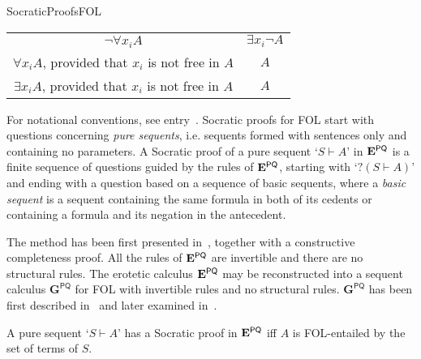 \begin{entry}{SocraticProofsFOL}
\begin{calculus}
\begin{center}
\begin{tabular}{c|c}
$\neg\forall x_{i}A$ & $\exists x_{i}\neg A$ \\
			
$\forall x_{i}A$, provided that $x_{i}$ is not free in $A$ & $A$ \\
			
$\exists x_{i}A$, provided that $x_{i}$ is not free in $A$ & $A$ \\
	\end{tabular}

\end{center}
\end{calculus}

\begin{clarifications}
For notational conventions, see entry~. Socratic proofs for FOL start with questions concerning \textit{pure sequents}, i.e. sequents formed with sentences only and containing no parameters. A Socratic proof of a pure sequent `$S \vdash A$' in $\mathbf{E}^\mathsf{PQ}$ is a finite sequence of questions guided by the rules of $\mathbf{E}^\mathsf{PQ}$, starting with `$? (S \vdash A)$' and ending with a question based on a sequence of basic sequents, where a \textit{basic sequent} is a sequent containing the same formula in both of its cedents or containing a formula and its negation in the antecedent.
\end{clarifications}

 \begin{history}
The method has been first presented in~\cite{AW:2006SPQ}, together with a constructive completeness proof. All the rules of $\mathbf{E}^\mathsf{PQ}$ are invertible and there are no structural rules. The erotetic calculus $\mathbf{E}^\mathsf{PQ}$ may be reconstructed into a sequent calculus $\mathbf{G}^\mathsf{PQ}$ for FOL with invertible rules and no structural rules. $\mathbf{G}^\mathsf{PQ}$ has been first described in~\cite{AW:2006SPQ} and later examined in~\cite{LJUW:2013}.
\end{history}

\begin{technicalities}
A pure sequent `$S \vdash A$' has a Socratic proof in $\mathbf{E}^\mathsf{PQ}$ iff $A$ is FOL-entailed by the set of terms of $S$.
\end{technicalities}













\end{entry}
